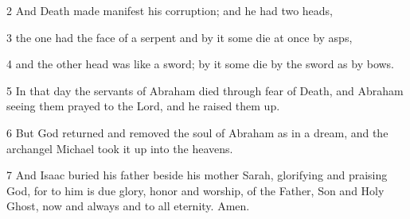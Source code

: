 \par 2 And Death made manifest his corruption; and he had two heads, 

\par 3 the one had the face of a serpent and by it some die at once by asps, 

\par 4 and the other head was like a sword; by it some die by the sword as by bows. 

\par 5 In that day the servants of Abraham died through fear of Death, and Abraham seeing them prayed to the Lord, and he raised them up. 

\par 6 But God returned and removed the soul of Abraham as in a dream, and the archangel Michael took it up into the heavens. 

\par 7 And Isaac buried his father beside his mother Sarah, glorifying and praising God, for to him is due glory, honor and worship, of the Father, Son and Holy Ghost, now and always and to all eternity. Amen.


